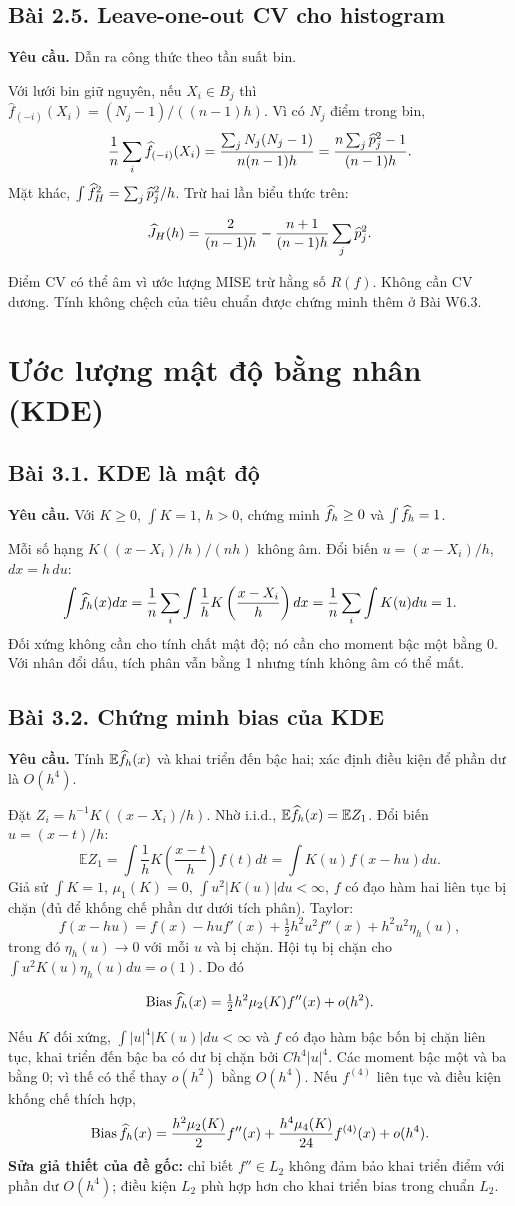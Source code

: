\documentclass[11pt,a4paper]{article}
\newcommand{\E}{\mathbb E}\newcommand{\Pp}{\mathbb P}
\DeclareMathOperator{\Bias}{Bias}\DeclareMathOperator{\MSE}{MSE}
\newcommand{\prob}[3]{\subsection{Bài #1. #2}\label{b:#1}\textbf{Yêu cầu.} #3\par}
\begin{document}
\prob{2.5}{Leave-one-out CV cho histogram}{Dẫn ra công thức theo tần suất bin.}
Với lưới bin giữ nguyên, nếu $X_i\in B_j$ thì
$\widehat f_{(-i)}(X_i)=(N_j-1)/((n-1)h)$. Vì có $N_j$ điểm trong bin,
\[
\frac1n\sum_i\widehat f_{(-i)}(X_i)
=\frac{\sum_jN_j(N_j-1)}{n(n-1)h}
=\frac{n\sum_j\widehat p_j^2-1}{(n-1)h}.
\]
Mặt khác, $\int\widehat f_H^2=\sum_j\widehat p_j^2/h$. Trừ hai lần biểu thức trên:
\begin{result}
\[
\widehat J_H(h)=\frac2{(n-1)h}-\frac{n+1}{(n-1)h}\sum_j\widehat p_j^2.
\]
\end{result}
Điểm CV có thể âm vì ước lượng MISE trừ hằng số $R(f)$. Không cần CV dương. Tính không chệch của tiêu chuẩn được chứng minh thêm ở Bài W6.3.
\clearpage
\section{Ước lượng mật độ bằng nhân (KDE)}
\prob{3.1}{KDE là mật độ}{Với $K\ge0$, $\int K=1$, $h>0$, chứng minh $\widehat f_h\ge0$ và $\int\widehat f_h=1$.}
Mỗi số hạng $K((x-X_i)/h)/(nh)$ không âm. Đổi biến $u=(x-X_i)/h$, $dx=h\,du$:
\[
\int\widehat f_h(x)dx=\frac1n\sum_i\int\frac1hK\left(\frac{x-X_i}{h}\right)dx
=\frac1n\sum_i\int K(u)du=1.
\]
Đối xứng không cần cho tính chất mật độ; nó cần cho moment bậc một bằng 0. Với nhân đổi dấu, tích phân vẫn bằng 1 nhưng tính không âm có thể mất.

\prob{3.2}{Chứng minh bias của KDE}{Tính $\E\fh(x)$ và khai triển đến bậc hai; xác định điều kiện để phần dư là $O(h^4)$.}
Đặt $Z_i=h^{-1}K((x-X_i)/h)$. Nhờ i.i.d., $\E\fh(x)=\E Z_1$. Đổi biến $u=(x-t)/h$:
\[
\E Z_1=\int\frac1hK\left(\frac{x-t}{h}\right)f(t)dt
=\int K(u)f(x-hu)du.
\]
Giả sử $\int K=1$, $\mu_1(K)=0$, $\int u^2|K(u)|du<\infty$, $f$ có đạo hàm hai liên tục bị chặn (đủ để khống chế phần dư dưới tích phân). Taylor:
\[
f(x-hu)=f(x)-hu f'(x)+\tfrac12h^2u^2 f''(x)+h^2u^2\eta_h(u),
\]
trong đó $\eta_h(u)\to0$ với mỗi $u$ và bị chặn. Hội tụ bị chặn cho $\int u^2K(u)\eta_h(u)du=o(1)$. Do đó
\begin{result}
\[
\Bias\fh(x)=\tfrac12h^2\mu_2(K)f''(x)+o(h^2).
\]
\end{result}
Nếu $K$ đối xứng, $\int |u|^4|K(u)|du<\infty$ và $f$ có đạo hàm bậc bốn bị chặn liên tục, khai triển đến bậc ba có dư bị chặn bởi $C h^4|u|^4$. Các moment bậc một và ba bằng 0; vì thế có thể thay $o(h^2)$ bằng $O(h^4)$. Nếu $f^{(4)}$ liên tục và điều kiện khống chế thích hợp,
\[
\Bias\fh(x)=\frac{h^2\mu_2(K)}2 f''(x)+\frac{h^4\mu_4(K)}{24}f^{(4)}(x)+o(h^4).
\]
\textbf{Sửa giả thiết của đề gốc:} chỉ biết $f''\in L_2$ không đảm bảo khai triển điểm với phần dư $O(h^4)$; điều kiện $L_2$ phù hợp hơn cho khai triển bias trong chuẩn $L_2$.
\end{document}
